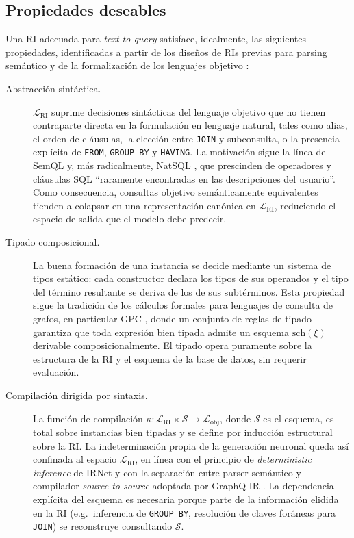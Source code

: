 \subsection{Propiedades deseables}

Una \ac{RI} adecuada para \emph{text-to-query} satisface, idealmente, las siguientes propiedades, identificadas a partir de los diseños de \acp{RI} previas para parsing semántico \cite{guo2019irnet,gan2021natsql,herzig2021unlocking,nie2022graphqir} y de la formalización de los lenguajes objetivo \cite{francis2023gpc,deutsch2022graph}:

\begin{description}
\item[Abstracción sintáctica.] $\mathcal{L}_{\mathrm{RI}}$ suprime decisiones sintácticas del lenguaje objetivo que no tienen contraparte directa en la formulación en lenguaje natural, tales como alias, el orden de cláusulas, la elección entre \texttt{JOIN} y subconsulta, o la presencia explícita de \texttt{FROM}, \texttt{GROUP BY} y \texttt{HAVING}. La motivación sigue la línea de SemQL \cite{guo2019irnet} y, más radicalmente, NatSQL \cite{gan2021natsql}, que prescinden de operadores y cláusulas SQL ``raramente encontradas en las descripciones del usuario''. Como consecuencia, consultas objetivo semánticamente equivalentes tienden a colapsar en una representación canónica en $\mathcal{L}_{\mathrm{RI}}$, reduciendo el espacio de salida que el modelo debe predecir.

\item[Tipado composicional.] La buena formación de una instancia se decide mediante un sistema de tipos estático: cada constructor declara los tipos de sus operandos y el tipo del término resultante se deriva de los de sus subtérminos. Esta propiedad sigue la tradición de los cálculos formales para lenguajes de consulta de grafos, en particular GPC \cite{francis2023gpc}, donde un conjunto de reglas de tipado garantiza que toda expresión bien tipada admite un esquema $\mathrm{sch}(\xi)$ derivable composicionalmente. El tipado opera puramente sobre la estructura de la \ac{RI} y el esquema de la base de datos, sin requerir evaluación.

\item[Compilación dirigida por sintaxis.] La función de compilación $\kappa : \mathcal{L}_{\mathrm{RI}} \times \mathcal{S} \rightarrow \mathcal{L}_{\mathrm{obj}}$, donde $\mathcal{S}$ es el esquema, es total sobre instancias bien tipadas y se define por inducción estructural sobre la \ac{RI}. La indeterminación propia de la generación neuronal queda así confinada al espacio $\mathcal{L}_{\mathrm{RI}}$, en línea con el principio de \emph{deterministic inference} de IRNet \cite{guo2019irnet} y con la separación entre parser semántico y compilador \emph{source-to-source} adoptada por GraphQ IR \cite{nie2022graphqir}. La dependencia explícita del esquema es necesaria porque parte de la información elidida en la \ac{RI} (e.g.\ inferencia de \texttt{GROUP BY}, resolución de claves foráneas para \texttt{JOIN}) se reconstruye consultando $\mathcal{S}$. %


\end{description}
